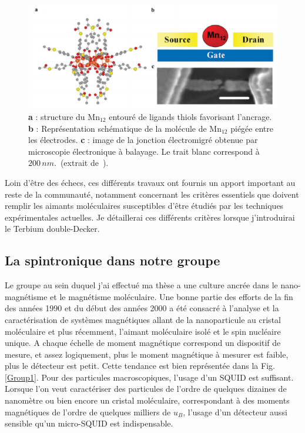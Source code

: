 \begin{figure}
\centering \includegraphics[scale=0.45]{Spintronique/MolSpintro/MolSpintro.pdf}
\caption{\textbf{a} : structure du Mn$_{12}$ entouré de ligands thiols favorisant l'ancrage. \textbf{b} : Représentation schématique de la molécule de Mn$_{12}$ piégée entre les électrodes. \textbf{c} : image de la jonction électromigré obtenue par microscopie électronique à balayage. Le trait blanc correspond à $200\,nm$.~(extrait de~\cite{Heersche2006}).}
\label{MolSpintro}
\end{figure}

Loin d'\^etre des échecs, ces différents travaux ont fournis un apport important au reste de la communauté, notamment concernant les critères essentiels que doivent remplir les aimants moléculaires susceptibles d'être étudiés par les techniques expérimentales actuelles. Je détaillerai ces différents critères lorsque j'introduirai le Terbium double-Decker.
 
\subsection{La spintronique dans notre groupe}
Le groupe au sein duquel j'ai effectué ma thèse a une culture ancrée dans le nano-magnétisme et le magnétisme moléculaire. Une bonne partie des efforts de la fin des années 1990 et du début des années 2000 a été consacré à l'analyse et la caractérisation de systèmes magnétiques allant de la nanoparticule au cristal moléculaire  et plus récemment, l'aimant moléculaire isolé et le spin nucléaire unique. A chaque échelle de moment magnétique correspond un dispositif de mesure, et assez logiquement, plus le moment magnétique à mesurer est faible, plus le détecteur est petit. Cette tendance est bien représentée dans la Fig.\ref{Group1}. Pour des particules macroscopiques, l'usage d'un SQUID est suffisant. Lorsque l'on veut caractériser des particules de l'ordre de quelques dizaines de nanomètre ou bien encore un cristal moléculaire, correspondant à des moments magnétiques de l'ordre de quelques milliers de $u_B$, l'usage d'un détecteur aussi sensible qu'un micro-SQUID est indispensable.


